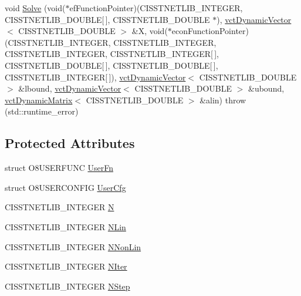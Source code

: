 \begin{DoxyCompactItemize}
\item 
void \hyperlink{classnmr_fmin_solver_a59f7eab6193a1047a251e22964529950}{Solve} (void($\ast$ef\-Function\-Pointer)(C\-I\-S\-S\-T\-N\-E\-T\-L\-I\-B\-\_\-\-I\-N\-T\-E\-G\-E\-R, C\-I\-S\-S\-T\-N\-E\-T\-L\-I\-B\-\_\-\-D\-O\-U\-B\-L\-E\mbox{[}$\,$\mbox{]}, C\-I\-S\-S\-T\-N\-E\-T\-L\-I\-B\-\_\-\-D\-O\-U\-B\-L\-E $\ast$), \hyperlink{classvct_dynamic_vector}{vct\-Dynamic\-Vector}$<$ C\-I\-S\-S\-T\-N\-E\-T\-L\-I\-B\-\_\-\-D\-O\-U\-B\-L\-E $>$ \&X, void($\ast$econ\-Function\-Pointer)(C\-I\-S\-S\-T\-N\-E\-T\-L\-I\-B\-\_\-\-I\-N\-T\-E\-G\-E\-R, C\-I\-S\-S\-T\-N\-E\-T\-L\-I\-B\-\_\-\-I\-N\-T\-E\-G\-E\-R, C\-I\-S\-S\-T\-N\-E\-T\-L\-I\-B\-\_\-\-I\-N\-T\-E\-G\-E\-R, C\-I\-S\-S\-T\-N\-E\-T\-L\-I\-B\-\_\-\-I\-N\-T\-E\-G\-E\-R\mbox{[}$\,$\mbox{]}, C\-I\-S\-S\-T\-N\-E\-T\-L\-I\-B\-\_\-\-D\-O\-U\-B\-L\-E\mbox{[}$\,$\mbox{]}, C\-I\-S\-S\-T\-N\-E\-T\-L\-I\-B\-\_\-\-D\-O\-U\-B\-L\-E\mbox{[}$\,$\mbox{]}, C\-I\-S\-S\-T\-N\-E\-T\-L\-I\-B\-\_\-\-I\-N\-T\-E\-G\-E\-R\mbox{[}$\,$\mbox{]}), \hyperlink{classvct_dynamic_vector}{vct\-Dynamic\-Vector}$<$ C\-I\-S\-S\-T\-N\-E\-T\-L\-I\-B\-\_\-\-D\-O\-U\-B\-L\-E $>$ \&lbound, \hyperlink{classvct_dynamic_vector}{vct\-Dynamic\-Vector}$<$ C\-I\-S\-S\-T\-N\-E\-T\-L\-I\-B\-\_\-\-D\-O\-U\-B\-L\-E $>$ \&ubound, \hyperlink{classvct_dynamic_matrix}{vct\-Dynamic\-Matrix}$<$ C\-I\-S\-S\-T\-N\-E\-T\-L\-I\-B\-\_\-\-D\-O\-U\-B\-L\-E $>$ \&alin)  throw (std\-::runtime\-\_\-error)
\end{DoxyCompactItemize}
\subsection*{Protected Attributes}
\begin{DoxyCompactItemize}
\item 
struct O8\-U\-S\-E\-R\-F\-U\-N\-C \hyperlink{classnmr_fmin_solver_aae14c67da4d9b2d740a1adb8873904b3}{User\-Fn}
\item 
struct O8\-U\-S\-E\-R\-C\-O\-N\-F\-I\-G \hyperlink{classnmr_fmin_solver_a7116a6ed46d966947aaf356e22028a5d}{User\-Cfg}
\item 
C\-I\-S\-S\-T\-N\-E\-T\-L\-I\-B\-\_\-\-I\-N\-T\-E\-G\-E\-R \hyperlink{classnmr_fmin_solver_ab326c4ad9de626447c1ddd93e3be57c1}{N}
\item 
C\-I\-S\-S\-T\-N\-E\-T\-L\-I\-B\-\_\-\-I\-N\-T\-E\-G\-E\-R \hyperlink{classnmr_fmin_solver_a0e26ac271bc1782ceacbafd644f2ed8c}{N\-Lin}
\item 
C\-I\-S\-S\-T\-N\-E\-T\-L\-I\-B\-\_\-\-I\-N\-T\-E\-G\-E\-R \hyperlink{classnmr_fmin_solver_a3dc96e979c554f7f270cd9957372c801}{N\-Non\-Lin}
\item 
C\-I\-S\-S\-T\-N\-E\-T\-L\-I\-B\-\_\-\-I\-N\-T\-E\-G\-E\-R \hyperlink{classnmr_fmin_solver_ab4781ddbf8c710e1758195e8d7024382}{N\-Iter}
\item 
C\-I\-S\-S\-T\-N\-E\-T\-L\-I\-B\-\_\-\-I\-N\-T\-E\-G\-E\-R \hyperlink{classnmr_fmin_solver_a597036b665386a5e4fcc0028843d1bc3}{N\-Step}
\end{DoxyCompactItemize}


